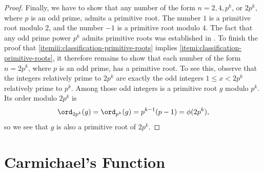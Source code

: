 \begin{proof}
  Finally, we have to show that any number of the form $n=2,4,p^k$, or $2p^k$, where $p$ is an odd prime, admits a primitive root. The number $1$ is a primitive root modulo $2$, and the number $-1$ is a primitive root modulo $4$. The fact that any odd prime power $p^k$ admits primitive roots was established in . To finish the proof that \ref{itemiii:classification-primitive-roots} implies \ref{itemi:classification-primitive-roots}, it therefore remains to show that each number of the form $n=2p^k$, where $p$ is an odd prime, has a primitive root. To see this, observe that the integers relatively prime to $2p^k$ are exactly the odd integers $1\leq x<2p^k$ relatively prime to $p^k$. Among those odd integers is a primitive root $g$ modulo $p^k$. Its order modulo $2p^k$ is
  \begin{equation*}
    \ord_{2p^k}(g)=\ord_{p^k}(g)=p^{k-1}(p-1)=\phi(2p^k),
  \end{equation*}
  so we see that $g$ is also a primitive root of $2p^k$.
\end{proof}

\section{Carmichael's Function}

